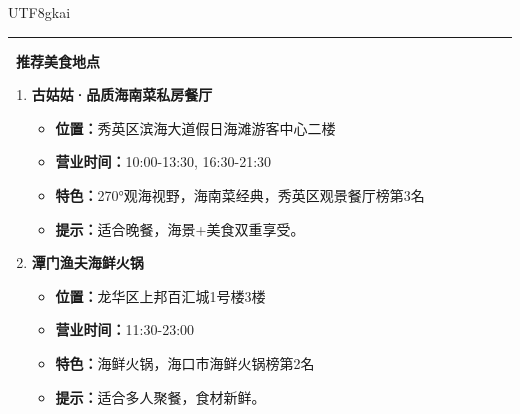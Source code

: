 \documentclass{article} %
\begin{document}
\begin{CJK*}{UTF8}{gkai}
\begin{tcolorbox}[
    breakable,
    enhanced,
    colframe=color_amapblue,
    colback=mycolor,
    coltitle=white,
    title = {\textbf{Case Study: Route-based Dining Recommendation}},
    fonttitle=\bfseries
]
\begin{tcolorbox}[colback=white, colframe=color_amapblue!30!white, arc=4pt, boxrule=1pt, left=4pt, right=4pt, top=4pt, bottom=4pt]
    \par\noindent\rule{\textwidth}{0.4pt} %
    
    \textbf{\textcolor{color_amapblue}{\faUtensils\ 推荐美食地点}}
    \begin{enumerate}[leftmargin=15pt, itemsep=4pt, topsep=2pt]
    \item \textbf{古姑姑·品质海南菜私房餐厅}
    \begin{itemize}[leftmargin=10pt, label={\tiny\textbullet}, itemsep=0pt, parsep=0pt]
        \item \textbf{位置：}秀英区滨海大道假日海滩游客中心二楼
        \item \textbf{营业时间：}10:00-13:30, 16:30-21:30
        \item \textbf{特色：}270°观海视野，海南菜经典，秀英区观景餐厅榜第3名
        \item \textbf{提示：}适合晚餐，海景+美食双重享受。
    \end{itemize}

    \item \textbf{潭门渔夫海鲜火锅}
    \begin{itemize}[leftmargin=10pt, label={\tiny\textbullet}, itemsep=0pt, parsep=0pt]
        \item \textbf{位置：}龙华区上邦百汇城1号楼3楼
        \item \textbf{营业时间：}11:30-23:00
        \item \textbf{特色：}海鲜火锅，海口市海鲜火锅榜第2名
        \item \textbf{提示：}适合多人聚餐，食材新鲜。
    \end{itemize}


\end{enumerate}
\end{tcolorbox}
\end{tcolorbox}
\end{CJK*}
\end{document}
